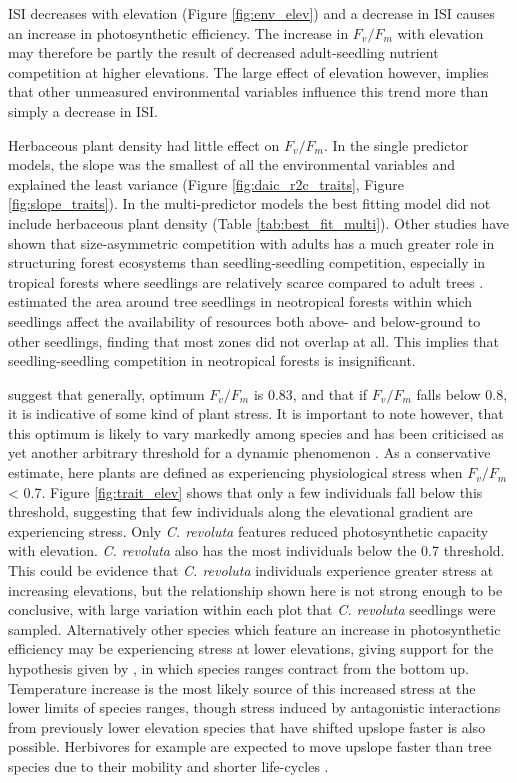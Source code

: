 \documentclass[a4paper, 11pt]{article}
\newcommand{\textapprox}{\raisebox{0.5ex}{\texttildelow}}
\begin{document}
ISI decreases with elevation (Figure \ref{fig:env_elev}) and a decrease in ISI causes an increase in photosynthetic efficiency. The increase in $F_v/F_m$ with elevation may therefore be partly the result of decreased adult-seedling nutrient competition at higher elevations. The large effect of elevation however, implies that other unmeasured environmental variables influence this trend more than simply  a decrease in ISI.

Herbaceous plant density had little effect on $F_v/F_m$. In the single predictor models, the slope was the smallest of all the environmental variables and explained the least variance (Figure \ref{fig:daic_r2c_traits}, Figure \ref{fig:slope_traits}). In the multi-predictor models the best fitting model did not include herbaceous plant density (Table \ref{tab:best_fit_multi}). Other studies have shown that size-asymmetric competition with adults has a much greater role in structuring forest ecosystems than seedling-seedling competition, especially in tropical forests where seedlings are relatively scarce compared to adult trees \citep{Moles2004, Powers2004}. \citet{Paine2008} estimated the area around tree seedlings in neotropical forests within which seedlings affect the availability of resources both above- and below-ground to other seedlings, finding that most zones did not overlap at all. This implies that seedling-seedling competition in neotropical forests is insignificant. 

\citet{Maxwell2000} suggest that generally, optimum $F_v/F_m$ is \textapprox0.83, and that if $F_v/F_m$ falls below \textapprox0.8, it is indicative of some kind of plant stress. It is important to note however, that this optimum is likely to vary markedly among species and has been criticised as yet another arbitrary threshold for a dynamic phenomenon \citep{Ghouil2003}. As a conservative estimate, here plants are defined as experiencing physiological stress when $F_v/F_m$ \textless{} 0.7. Figure \ref{fig:trait_elev} shows that only a few individuals fall below this threshold, suggesting that few individuals along the elevational gradient are experiencing stress. Only \textit{C. revoluta} features reduced photosynthetic capacity with elevation. \textit{C. revoluta} also has the most individuals below the 0.7 threshold. This could be evidence that \textit{C. revoluta} individuals experience greater stress at increasing elevations, but the relationship shown here is not strong enough to be conclusive, with large variation within each plot that \textit{C. revoluta} seedlings were sampled. Alternatively other species which feature an increase in photosynthetic efficiency may be experiencing stress at lower elevations, giving support for the hypothesis given by \citet{Campbell2007}, in which species ranges contract from the bottom up. Temperature increase is the most likely source of this increased stress at the lower limits of species ranges, though stress induced by antagonistic interactions from previously lower elevation species that have shifted upslope faster is also possible. Herbivores for example are expected to move upslope faster than tree species due to their mobility and shorter life-cycles \citep{Chen2011}.
\end{document}
